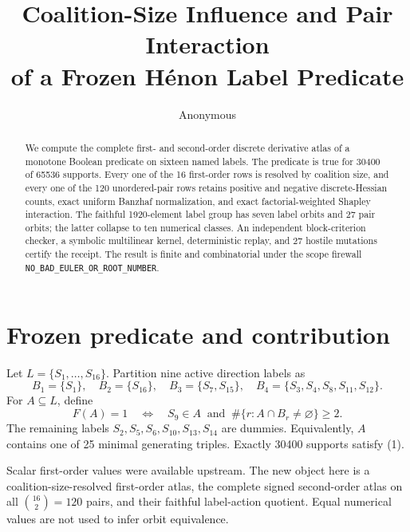 \documentclass[10pt]{article}
\title{Coalition-Size Influence and Pair Interaction\\
of a Frozen H\'enon Label Predicate}
\author{Anonymous}
\date{}
\newcommand{\cF}{F}
\newcommand{\cL}{L}
\begin{document}
\maketitle

\begin{abstract}
We compute the complete first- and second-order discrete derivative atlas of
a monotone Boolean predicate on sixteen named labels.  The predicate is true
for 30400 of 65536 supports.  Every one of the 16 first-order rows is resolved
by coalition size, and every one of the 120 unordered-pair rows retains
positive and negative discrete-Hessian counts, exact uniform Banzhaf
normalization, and exact factorial-weighted Shapley interaction.  The faithful
1920-element label group has seven label orbits and 27 pair orbits; the latter
collapse to ten numerical classes.  An independent block-criterion checker, a
symbolic multilinear kernel, deterministic replay, and 27 hostile mutations
certify the receipt.  The result is finite and combinatorial under the scope
firewall \texttt{NO\_BAD\_EULER\_OR\_ROOT\_NUMBER}.
\end{abstract}

\section{Frozen predicate and contribution}
Let $\cL=\{S_1,\ldots,S_{16}\}$.  Partition nine active direction labels as
\[
 B_1=\{S_1\},\quad B_2=\{S_{16}\},\quad
 B_3=\{S_7,S_{15}\},\quad
 B_4=\{S_3,S_4,S_8,S_{11},S_{12}\}.
\]
For $A\subseteq\cL$, define
\[
 \cF(A)=1
 \quad\Longleftrightarrow\quad
 S_9\in A\ \text{ and }\ \#\{r:A\cap B_r\ne\varnothing\}\geq2.
 \tag{1}
\]
The remaining labels $S_2,S_5,S_6,S_{10},S_{13},S_{14}$ are dummies.
Equivalently, $A$ contains one of 25 minimal generating triples.  Exactly
30400 supports satisfy (1).

Scalar first-order values were available upstream.  The new object here is a
coalition-size-resolved first-order atlas, the complete signed second-order
atlas on all $\binom{16}{2}=120$ pairs, and their faithful label-action
quotient.  Equal numerical values are not used to infer orbit equivalence.
\end{document}
